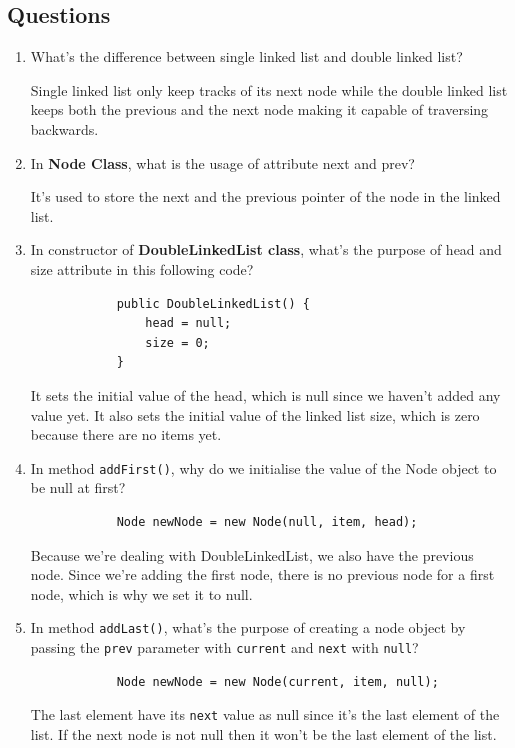 \documentclass[12pt,titlepage]{article}
\begin{document}
\subsection*{Questions}
\begin{enumerate}
    \item {
        What's the difference between single linked list and double linked list?

        Single linked list only keep tracks of its next node while the double linked list
        keeps both the previous and the next node making it capable of traversing backwards.
    }
    \item {
        In \textbf{Node Class}, what is the usage of attribute next and prev?

        It's used to store the next and the previous pointer of the node in the linked list.
    }
    \item {
        In constructor of \textbf{DoubleLinkedList class}, what's the purpose of head and size attribute
        in this following code?

        \begin{verbatim}
            public DoubleLinkedList() {
                head = null;
                size = 0;
            }
        \end{verbatim}

        It sets the initial value of the head, which is null since we haven't added any value yet.
        It also sets the initial value of the linked list size, which is zero because there are no items yet.
    }
    \item {
        In method \texttt{addFirst()}, why do we initialise the value of the Node object to be null at first?

        \begin{verbatim}
            Node newNode = new Node(null, item, head);
        \end{verbatim}

        Because we're dealing with DoubleLinkedList, we also have the previous node. Since we're adding the first node,
        there is no previous node for a first node, which is why we set it to null.
    }
    \item {
        In method \texttt{addLast()}, what's the purpose of creating a node object by passing the \texttt{prev} parameter
        with \texttt{current} and \texttt{next} with \texttt{null}?

        \begin{verbatim}
            Node newNode = new Node(current, item, null);
        \end{verbatim}

        The last element have its \texttt{next} value as null since it's the last element of the list.
        If the next node is not null then it won't be the last element of the list.
    }
\end{enumerate}
\end{document}
